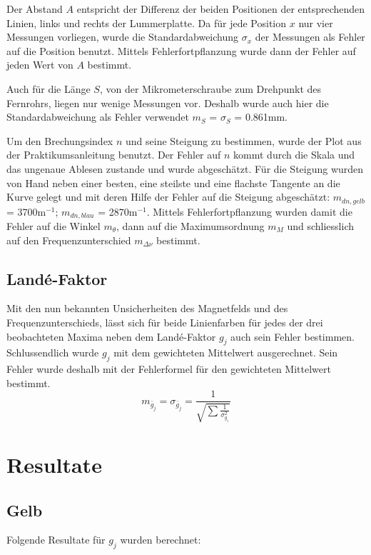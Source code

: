 \documentclass[a4paper,parskip,11pt, DIV12]{scrreprt}
\begin{document}
	Der Abstand $A$ entspricht der Differenz der beiden Positionen der entsprechenden Linien, links und rechts der Lummerplatte. Da für jede Position $x$ nur vier Messungen vorliegen, wurde die Standardabweichung $\sigma_x$ der Messungen als Fehler auf die Position benutzt. Mittels Fehlerfortpflanzung wurde dann der Fehler auf jeden Wert von $A$ bestimmt.
	
	Auch für die Länge $S$, von der Mikrometerschraube zum Drehpunkt des Fernrohrs, liegen nur wenige Messungen vor. Deshalb wurde auch hier die Standardabweichung als Fehler verwendet $m_S$ = $\sigma_S$ = 0.861mm.
	
	Um den Brechungsindex $n$ und seine Steigung zu bestimmen, wurde der Plot aus der Praktikumsanleitung benutzt. Der Fehler auf $n$ kommt durch die Skala und das ungenaue Ablesen zustande und wurde abgeschätzt.
Für die Steigung wurden von Hand neben einer besten, eine steilste und eine flachste Tangente an die Kurve gelegt und mit deren Hilfe der Fehler auf die Steigung abgeschätzt: $m_{dn,gelb}$ = 3700m$^{-1}$; $m_{dn,blau}$ = 2870m$^{-1}$.
	Mittels Fehlerfortpflanzung wurden damit die Fehler auf die Winkel $m_{\theta}$, dann auf die Maximumsordnung $m_M$ und schliesslich auf den Frequenzunterschied $m_{\Delta \nu}$ bestimmt.
	
	\section{Landé-Faktor}
	
	Mit den nun bekannten Unsicherheiten des Magnetfelds und des Frequenzunterschieds, lässt sich für beide Linienfarben für jedes der drei beobachteten Maxima neben dem Landé-Faktor $g_j$ auch sein Fehler bestimmen. Schlussendlich wurde $g_j$ mit dem gewichteten Mittelwert ausgerechnet. Sein Fehler wurde deshalb mit der Fehlerformel für den gewichteten Mittelwert bestimmt. 
	\begin{equation}
	\label{Fehler gewichteter Mittelwert}
	m _{\bar{g}_j} = \sigma_{\bar{g}_j} = \frac{1}{\sqrt{\sum \frac{1}{\sigma_{g_i}^2}}}
	\end{equation}
	
	\chapter{Resultate}
	
	\section{Gelb}
	Folgende Resultate für $g_j$ wurden berechnet:
	
\end{document}
